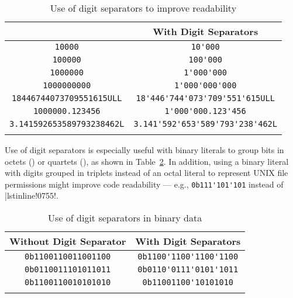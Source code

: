 \begin{table}[h!]
\begin{center}
\begin{threeparttable}
\caption{Use of digit separators to improve readability}\label{digitseparator-table1}\vspace{1.5ex}
{\small \begin{tabular}{c|c}\thickhline
\rowcolor[gray]{.9}{\sffamily\bfseries Without Digit Separator} & {\sffamily\bfseries With Digit Separators} \\ \hline
\lstinline!10000! & \lstinline!10'000! \\ \hline 
\lstinline!100000! & \lstinline!100'000! \\ \hline 
\lstinline!1000000! & \lstinline!1'000'000! \\ \hline 
\lstinline!1000000000! & \lstinline!1'000'000'000! \\ \hline
\lstinline!18446744073709551615ULL! & \lstinline!18'446'744'073'709'551'615ULL! \\ \hline 
\lstinline!1000000.123456! & \lstinline!1'000'000.123'456! \\ \hline 
\lstinline!3.141592653589793238462L! & \lstinline!3.141'592'653'589'793'238'462L! \\ \thickhline
\end{tabular}
} %
\end{threeparttable}
\end{center} 
\end{table} 
\noindent Use of digit separators is especially useful with binary
literals to group bits in octets () or quartets
(), as shown in Table~\ref{digitseparator-table2}. In addition, using a binary literal with digits grouped in triplets instead of an octal literal to represent UNIX file permissions might improve code readability --- e.g., \lstinline!0b111'101'101! instead of |lstinline!0755!.\begin{table}[h!]
\begin{center}
\begin{threeparttable}
\caption{Use of digit separators in binary data}\label{digitseparator-table2}\vspace{1.5ex}
{\small \begin{tabular}{c|c}
\thickhline
\rowcolor[gray]{.9} {\sffamily\bfseries Without Digit Separator} & {\sffamily\bfseries With Digit Separators} \\\hline
\lstinline!0b1100110011001100! & \lstinline!0b1100'1100'1100'1100! \\ \hline
\lstinline!0b0110011101011011! & \lstinline!0b0110'0111'0101'1011! \\ \hline
\lstinline!0b1100110010101010! & \lstinline!0b11001100'10101010! \\
\thickhline
\end{tabular}
} %
\end{threeparttable}
\end{center}
\end{table}

